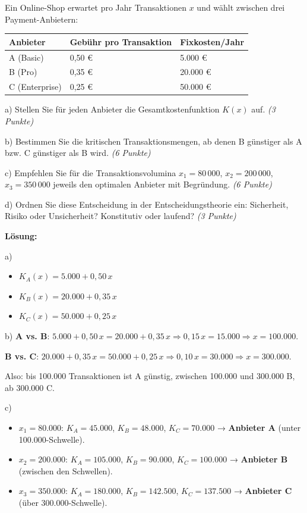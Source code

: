 \documentclass[11pt, a4paper]{article}
\begin{document}
Ein Online-Shop erwartet pro Jahr Transaktionen $x$ und wählt zwischen drei Payment-Anbietern:



{\small
\begin{tabularx}{\linewidth}{XXX}
\hline
\rowcolor{tableheadbg}
{\color{white}\textbf{Anbieter}} & {\color{white}\textbf{Gebühr pro Transaktion}} & {\color{white}\textbf{Fixkosten/Jahr}} \\[2pt]
\hline
\endhead
\hline
\endfoot
A (Basic) & 0,50 € & 5.000 € \\
B (Pro) & 0,35 € & 20.000 € \\
C (Enterprise) & 0,25 € & 50.000 € \\
\end{tabularx}
}


a) Stellen Sie für jeden Anbieter die Gesamtkostenfunktion $K(x)$ auf. \textit{(3 Punkte)}


b) Bestimmen Sie die kritischen Transaktionsmengen, ab denen B günstiger als A bzw. C günstiger als B wird. \textit{(6 Punkte)}


c) Empfehlen Sie für die Transaktionsvolumina $x_1 = 80\,000$, $x_2 = 200\,000$, $x_3 = 350\,000$ jeweils den optimalen Anbieter mit Begründung. \textit{(6 Punkte)}


d) Ordnen Sie diese Entscheidung in der Entscheidungstheorie ein: Sicherheit, Risiko oder Unsicherheit? Konstitutiv oder laufend? \textit{(3 Punkte)}


\textbf{Lösung:}


a)

\begin{itemize}
  \item $K_A(x) = 5.000 + 0{,}50\,x$
  \item $K_B(x) = 20.000 + 0{,}35\,x$
  \item $K_C(x) = 50.000 + 0{,}25\,x$
\end{itemize}

b) \textbf{A vs. B}: $5.000 + 0{,}50\,x = 20.000 + 0{,}35\,x \Rightarrow 0{,}15\,x = 15.000 \Rightarrow x = 100.000$.

\textbf{B vs. C}: $20.000 + 0{,}35\,x = 50.000 + 0{,}25\,x \Rightarrow 0{,}10\,x = 30.000 \Rightarrow x = 300.000$.


Also: bis 100.000 Transaktionen ist A günstig, zwischen 100.000 und 300.000 B, ab 300.000 C.


c)

\begin{itemize}
  \item $x_1 = 80.000$: $K_A = 45.000$, $K_B = 48.000$, $K_C = 70.000$ → \textbf{Anbieter A} (unter 100.000-Schwelle).
  \item $x_2 = 200.000$: $K_A = 105.000$, $K_B = 90.000$, $K_C = 100.000$ → \textbf{Anbieter B} (zwischen den Schwellen).
  \item $x_3 = 350.000$: $K_A = 180.000$, $K_B = 142.500$, $K_C = 137.500$ → \textbf{Anbieter C} (über 300.000-Schwelle).
\end{itemize}
\end{document}

